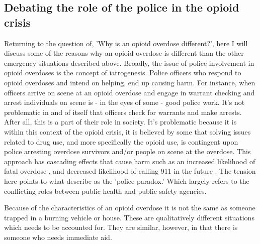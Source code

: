 \subsection{Debating the role of the police in the opioid crisis} %

Returning to the question of, 'Why is an opioid overdose different?', here I will discuss some of the reasons why an opioid overdose is different than the other emergency situations described above. Broadly, the issue of police involvement in opioid overdoses is the concept of iatrogenesis. Police officers who respond to opioid overdoses and intend on helping, end up causing harm. For instance, when officers arrive on scene at an opioid overdose and engage in warrant checking and arrest individuals on scene is - in the eyes of some - good police work. It's not problematic in and of itself that officers check for warrants and make arrests. After all, this is a part of their role in society. It's problematic because it is within this context of the opioid crisis, it is believed by some that solving issues related to drug use, and more specifically the opioid use, is contingent upon police arresting overdose survivors and/or people on scene at the overdose. This approach has cascading effects that cause harm such as an increased likelihood of fatal overdose \parencite{ray_spatiotemporal_2023, binswanger_clinical_2016, merrall_meta-analysis_2010}, and decreased likelihood of calling 911 in the future \parencite{bohnert_policing_2011}. The tension here points to what \textcite{carroll_police_2023} describe as the 'police paradox.' Which largely refers to the conflicting roles between public health and public safety agencies. 

Because of the characteristics of an opioid overdose it is not the same as someone trapped in a burning vehicle or house. These are qualitatively different situations which needs to be accounted for. They are similar, however, in that there is someone who needs immediate aid.

